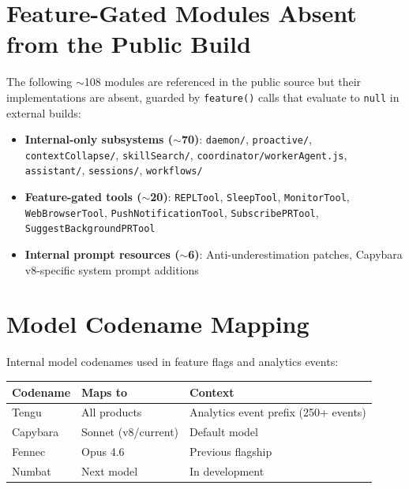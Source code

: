 \documentclass{article}
\newcommand{\file}[1]{\texttt{\small #1}}
\newcommand{\code}[1]{\texttt{#1}}
\begin{document}
\appendix

\section{Feature-Gated Modules Absent from the Public Build}
\label{app:missing}

The following $\sim$108 modules are referenced in the public source but their implementations are absent, guarded by \code{feature()} calls that evaluate to \code{null} in external builds:

\begin{itemize}
  \item \textbf{Internal-only subsystems ($\sim$70)}: \file{daemon/}, \file{proactive/}, \file{contextCollapse/}, \file{skillSearch/}, \file{coordinator/workerAgent.js}, \file{assistant/}, \file{sessions/}, \file{workflows/}
  \item \textbf{Feature-gated tools ($\sim$20)}: \code{REPLTool}, \code{SleepTool}, \code{MonitorTool}, \code{WebBrowserTool}, \code{PushNotificationTool}, \code{SubscribePRTool}, \code{SuggestBackgroundPRTool}
  \item \textbf{Internal prompt resources ($\sim$6)}: Anti-underestimation patches, Capybara v8-specific system prompt additions
\end{itemize}

\section{Model Codename Mapping}
\label{app:codenames}

Internal model codenames used in feature flags and analytics events:

\begin{center}
\begin{tabular}{lll}
\toprule
\textbf{Codename} & \textbf{Maps to} & \textbf{Context} \\
\midrule
Tengu    & All products & Analytics event prefix (250+ events) \\
Capybara & Sonnet (v8/current) & Default model \\
Fennec   & Opus 4.6    & Previous flagship \\
Numbat   & Next model  & In development \\
\bottomrule
\end{tabular}
\end{center}
\end{document}
